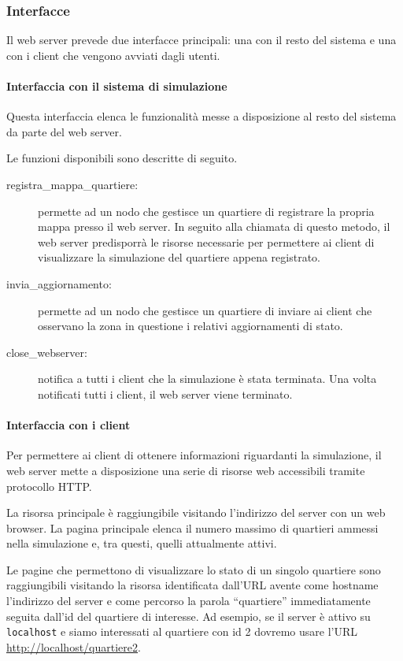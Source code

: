 \subsubsection{Interfacce}
Il web server prevede due interfacce principali: una con il resto del sistema e
una con i client che vengono avviati dagli utenti.

\paragraph*{Interfaccia con il sistema di simulazione}
Questa interfaccia elenca le funzionalità messe a disposizione al resto del
sistema da parte del web server.

Le funzioni disponibili sono descritte di seguito.
\begin{description}
	\item[registra\_mappa\_quartiere:] permette ad un nodo che gestisce un
	quartiere di registrare la propria mappa presso il web server. In seguito alla
	chiamata di questo metodo, il web server predisporrà le risorse necessarie per
	permettere ai client di visualizzare la simulazione del quartiere appena
	registrato.
	\item[invia\_aggiornamento:] permette ad un nodo che gestisce un quartiere di
	inviare ai client che osservano la zona in questione i relativi aggiornamenti
	di stato.
	\item[close\_webserver:] notifica a tutti i client che la simulazione è stata
	terminata. Una volta notificati tutti i client, il web server viene terminato.
\end{description}

\paragraph*{Interfaccia con i client}
Per permettere ai client di ottenere informazioni riguardanti la simulazione, il
web server mette a disposizione una serie di risorse web accessibili tramite
protocollo HTTP. 

La risorsa principale è raggiungibile visitando l'indirizzo del server con un
web browser.
La pagina principale elenca il numero massimo di quartieri ammessi nella
simulazione e, tra questi, quelli attualmente attivi.

Le pagine che permettono di visualizzare lo stato di un singolo quartiere sono
raggiungibili visitando la risorsa identificata dall'URL avente come hostname
l'indirizzo del server e come percorso la parola ``quartiere'' immediatamente
seguita dall'id del quartiere di interesse. Ad esempio, se il server è attivo su
\texttt{localhost} e siamo interessati al quartiere con id 2 dovremo usare l'URL
\url{http://localhost/quartiere2}.

